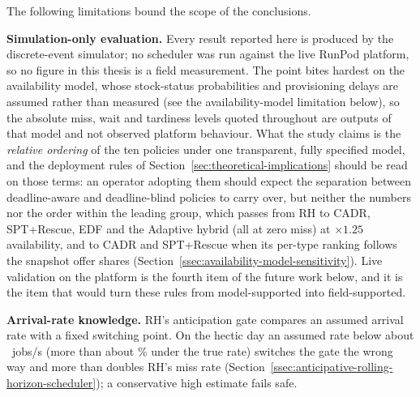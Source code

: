 {The following limitations bound the scope of the conclusions.

\textbf{Simulation-only evaluation.} Every result reported here is produced by the discrete-event simulator; no scheduler was run against the live RunPod platform, so no figure in this thesis is a field measurement. The point bites hardest on the availability model, whose stock-status probabilities and provisioning delays are assumed rather than measured (see the availability-model limitation below), so the absolute miss, wait and tardiness levels quoted throughout are outputs of that model and not observed platform behaviour. What the study claims is the \emph{relative ordering} of the ten policies under one transparent, fully specified model, and the deployment rules of Section~\ref{sec:theoretical-implications} should be read on those terms: an operator adopting them should expect the separation between deadline-aware and deadline-blind policies to carry over, but neither the numbers nor the order within the leading group, which passes from RH to CADR, SPT+Rescue, EDF and the Adaptive hybrid (all at zero miss) at $\times 1.25$ availability, and to CADR and SPT+Rescue when its per-type ranking follows the snapshot offer shares (Section~\ref{ssec:availability-model-sensitivity}). Live validation on the platform is the fourth item of the future work below, and it is the item that would turn these rules from model-supported into field-supported.

\textbf{Arrival-rate knowledge.} RH's anticipation gate compares an assumed arrival rate with a fixed switching point. On the hectic day an assumed rate below about \PriorGateLambda~jobs/s (more than about \PriorGateShortfall\% under the true rate) switches the gate the wrong way and more than doubles RH's miss rate (Section~\ref{ssec:anticipative-rolling-horizon-scheduler}); a conservative high estimate fails safe.

}
